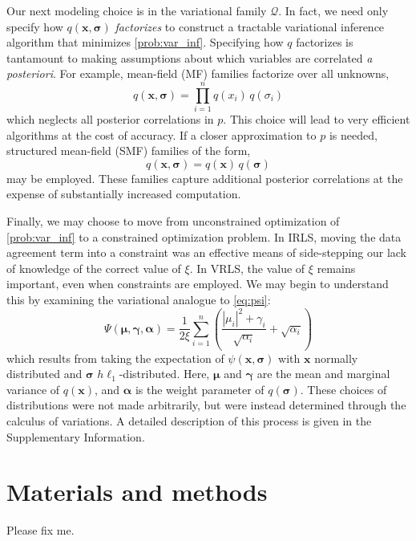 \documentclass[final,5p,times,twocolumn]{elsarticle}
\newcommand{\m}[1]{\boldsymbol{#1}}
\begin{document}
Our next modeling choice is in the variational family $\mathcal{Q}$. In
fact, we need only specify how $q(\m{x}, \m{\sigma})$ \emph{factorizes}
to construct a tractable variational inference algorithm that minimizes
\eqref{prob:var_inf}. Specifying how $q$ factorizes is tantamount to
making assumptions about which variables are correlated
\emph{a posteriori}. For example, mean-field (MF) families factorize
over all unknowns,
\begin{equation}
q(\m{x}, \m{\sigma}) =
 {\textstyle\prod}_{i=1}^n q(x_i) \, q(\sigma_i)
\label{eq:example_mf}
\end{equation}
which neglects all posterior correlations in $p$. This choice will lead
to very efficient algorithms at the cost of accuracy. If a closer
approximation to $p$ is needed, structured mean-field (SMF) families
of the form,
\begin{equation}
q(\m{x}, \m{\sigma}) = q(\m{x}) \, q(\m{\sigma})
\label{eq:example_smf}
\end{equation}
may be employed. These families capture additional posterior correlations
at the expense of substantially increased computation.

Finally, we may choose to move from unconstrained optimization of
\eqref{prob:var_inf} to a constrained optimization problem. In IRLS,
moving the data agreement term into a constraint was an effective means
of side-stepping our lack of knowledge of the correct value of $\xi$.
In VRLS, the value of $\xi$ remains important, even when constraints
are employed. We may begin to understand this by examining the variational
analogue to \eqref{eq:psi}:
\begin{equation}
\Psi(\m{\mu}, \m{\gamma}, \m{\alpha}) =
 \frac{1}{2 \xi} \sum_{i=1}^n \left(
  \frac{|\mu_i|^2 + \gamma_i}{\sqrt{\alpha_i}} + \sqrt{\alpha_i}
 \right)
\label{eq:psibar}
\end{equation}
which results from taking the expectation of $\psi(\m{x}, \m{\sigma})$
with $\m{x}$ normally distributed and $\m{\sigma}$ $h\ell_1$-distributed.
Here, $\m{\mu}$ and $\m{\gamma}$ are the mean and marginal variance of
$q(\m{x})$, and $\m{\alpha}$ is the weight parameter of $q(\m{\sigma})$.
These choices of distributions were not made arbitrarily, but were
instead determined through the calculus of variations. A detailed
description of this process is given in the Supplementary Information.

\section{Materials and methods}
\label{s:methods}
Please fix me.
\end{document}
